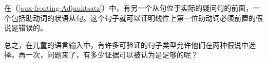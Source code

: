 在（\ref{aux-fronting-Adjunktsatz}）中，有另一个从句位于实际的疑问句的前面，一个包括助动词的状语从句。这个句子就可以证明线性上第一位助动词必须前置的假说是错误的\citep[]{Sampson89a}。

总之，在儿童的语言输入中，有许多可验证的句子类型允许他们在两种假说中选择。再一次，问题来了，有多少证据可以被认为是足够的呢？

